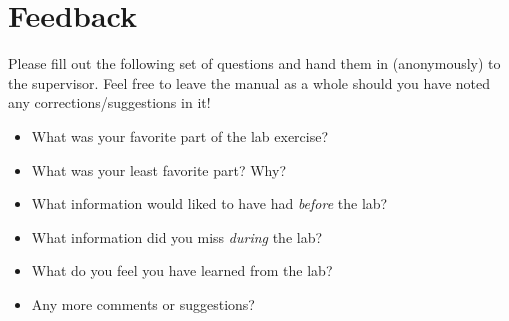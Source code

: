 \documentclass[a4,11pt, notitlepage]{article}
\begin{document}
\section{Feedback}
\label{sec:feedback}

Please fill out the following set of questions and hand them in
(anonymously) to the supervisor. Feel free to leave the manual as a
whole should you have noted any corrections/suggestions in it!

\begin{itemize}
\item What was your favorite part of the lab exercise?
\vspace{3cm}

\item What was your least favorite part? Why?
\vspace{3cm}

\item What information would liked to have had \emph{before} the lab?
\vspace{3cm}

\item What information did you miss \emph{during} the lab?
\vspace{3cm}

\item What do you feel you have learned from the lab?
\vspace{3cm}

\item Any more comments or suggestions?
\vspace{5cm}

\end{itemize}
\end{document}
